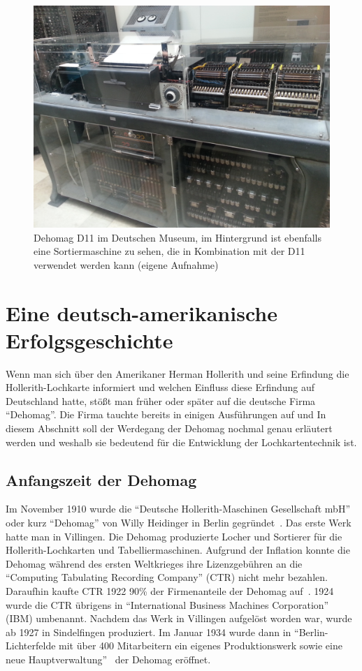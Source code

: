 \documentclass[parskip=half]{scrartcl}
\begin{document}
\begin{figure}[h]
  \centering
  \includegraphics[width=\textwidth]{d11}
  \caption{Dehomag D11 im Deutschen Museum, im Hintergrund ist ebenfalls eine
    Sortiermaschine zu sehen, die in Kombination mit der D11 verwendet werden
    kann (eigene Aufnahme)}
  \label{fig:d11}
\end{figure}

\section{Eine deutsch-amerikanische Erfolgsgeschichte}

Wenn man sich über den Amerikaner Herman Hollerith und seine Erfindung die
Hollerith-Lochkarte informiert und welchen Einfluss diese Erfindung auf
Deutschland hatte, stößt man früher oder später auf die deutsche Firma
\enquote{Dehomag}. Die Firma tauchte bereits in einigen Ausführungen auf und In
diesem Abschnitt soll der Werdegang der Dehomag nochmal genau erläutert werden
und weshalb sie bedeutend für die Entwicklung der Lochkartentechnik ist.

\subsection{Anfangszeit der Dehomag}

Im November 1910 wurde die \enquote{Deutsche Hollerith-Maschinen Gesellschaft
mbH} oder kurz \enquote{Dehomag} von Willy Heidinger in Berlin
gegründet~\cite{dingwerth}. Das erste Werk hatte man in Villingen. Die Dehomag
produzierte Locher und Sortierer für die Hollerith-Lochkarten und
Tabelliermaschinen. Aufgrund der Inflation konnte die Dehomag während des
ersten Weltkrieges ihre Lizenzgebühren an die \enquote{Computing Tabulating
Recording Company} (CTR) nicht mehr bezahlen.  Daraufhin kaufte CTR 1922 90\%
der Firmenanteile der Dehomag auf~\cite{restloseErfassung}. 1924 wurde die CTR
übrigens in \enquote{International Business Machines Corporation} (IBM)
umbenannt. Nachdem das Werk in Villingen aufgelöst worden war, wurde ab 1927 in
Sindelfingen produziert. Im Januar 1934 wurde dann in
\enquote{Berlin-Lichterfelde mit über 400 Mitarbeitern ein eigenes
Produktionswerk sowie eine neue Hauptverwaltung}~\cite{dingwerth} der Dehomag
eröffnet.
\end{document}
